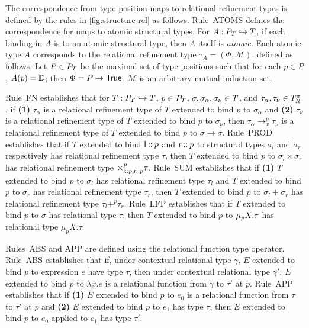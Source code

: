 The correspondence from type-position maps to relational refinement
types is defined by the rules in \autoref{fig:structure-rel} as
follows.
%
Rule~ATOMS defines the correspondence for maps to atomic structural
types.
For $A : P_T \hookrightarrow T$, if each binding in $A$ is to an
atomic structural type, then $A$ itself is \emph{atomic}.
Each atomic type $A$ corresponds to the relational refinement type
$\tau_A = (\Phi, \mathcal{M})$, defined as follows.
Let $P \in P_T$ be the maximal set of type positions such that for
each $p \in P$, $A(p) = \mathbb{D}$;
%
then $\Phi = P \mapsto \mathsf{True}$.
%
$\mathcal{M}$ is an arbitrary mutual-induction set.
%

Rule~FN establishes that for $T : P_T \hookrightarrow T$,
$p \in P_T$, $\sigma, \sigma_{\alpha}, \sigma_{\nu} \in T$,
and $\tau_{\alpha}, \tau_{\nu} \in T_{R}^{ \sigma }$, if %
\textbf{(1)} $\tau_{\alpha}$ is a relational refinement type of $T$
extended to bind $p$ to $\sigma_{\alpha}$ and %
\textbf{(2)} $\tau_{\nu}$ is a relational refinement type of $T$
extended to bind $p$ to $\sigma_{\nu}$, then
$\tau_{\alpha} \to_{x}^p \tau_{\nu}$ is a relational refinement type
of $T$ extended to bind $p$ to $\sigma \to \sigma$.
Rule~PROD establishes that if $T$ extended to bind
$\mathsf{l} \mathbin{::} p$ and $\mathsf{r} \mathbin{::} p$ to structural types
$\sigma_l$ and $\sigma_r$ respectively has relational refinement type
$\tau$, then $T$ extended to bind $p$ to $\sigma_l \times \sigma_r$
has relational refinement type
$\times_{ \mathsf{l} \mathbin{::} p, \mathsf{r} \mathbin{::} p}^{p} \tau$.
Rule~SUM establishes that if %
\textbf{(1)} $T$ extended to bind $p$ to $\sigma_l$ has relational
refinement type $\tau_l$ and $T$ extended to bind $p$ to $\sigma_r$
has relational refinement type $\tau_r$, then $T$ extended to bind $p$
to $\sigma_l + \sigma_r$ has relational refinement type
$\tau_l +^{p} \tau_r$.
%
Rule~LFP establishes that if %
$T$ extended to bind $p$ to $\sigma$ has relational type $\tau$, then
$T$ extended to bind $p$ to $\mu_p X. \tau$ has relational type
$\mu_p X. \tau$.

Rules~ABS and APP are defined using the relational function type
operator.
%
Rule~ABS establishes that if, under contextual relational type
$\gamma$, $E$ extended to bind $p$ to expression $e$ have type $\tau$,
then under contextual relational type $\gamma'$, $E$ extended to bind
$p$ to $\lambda x. e$ is a relational function from $\gamma$ to
$\tau'$ at $p$.
Rule~APP establishes that if %
\textbf{(1)} $E$ extended to bind $p$ to $e_0$ is a relational
function from $\tau$ to $\tau'$ at $p$ and %
\textbf{(2)} $E$ extended to bind $p$ to $e_1$ has type $\tau$, then
$E$ extended to bind $p$ to $e_0$ applied to $e_1$ has type $\tau'$.

